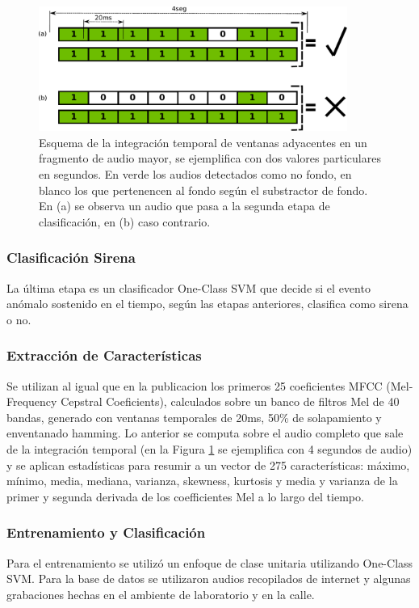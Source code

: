 \documentclass{article}
\begin{document}
\begin{figure}[h]
\begin{center}
\includegraphics[width=0.9\textwidth]{integracion_temporal} 
\caption{Esquema de la integración temporal de ventanas adyacentes en un fragmento de audio mayor, se ejemplifica con dos valores particulares en segundos. En verde los audios detectados como no fondo, en blanco los que pertenencen al fondo según el substractor de fondo. En (a) se observa un audio que pasa a la segunda etapa de clasificación, en (b) caso contrario.}
\label{fig:integracion_temporal}
\end{center}
\end{figure}
 
\subsubsection{Clasificación Sirena}
La última etapa es un clasificador One-Class SVM que decide si el evento anómalo sostenido en el tiempo, según las etapas anteriores, clasifica como sirena o no. 

\subsubsection*{Extracción de Características}
Se utilizan al igual que en la publicacion \cite{Salamon:UrbanSound:ACMMM:14} los primeros 25 coeficientes MFCC (Mel-Frequency Cepstral Coeficients), calculados sobre un banco de filtros Mel de 40 bandas, generado con ventanas temporales de 20ms, 50\% de solapamiento y enventanado hamming. Lo anterior se computa sobre el audio completo que sale de la integración temporal (en la Figura \ref{fig:integracion_temporal} se ejemplifica con 4 segundos de audio) y se aplican estadísticas para resumir a un vector de 275 características: máximo, mínimo, media, mediana, varianza, skewness, kurtosis y media y varianza de la primer y segunda derivada de los coefficientes Mel a lo largo del tiempo.

\subsubsection*{Entrenamiento y Clasificación}
Para el entrenamiento se utilizó un enfoque de clase unitaria utilizando One-Class SVM. Para la base de datos se utilizaron audios recopilados de internet y algunas grabaciones hechas en el ambiente de laboratorio y en la calle. 
\end{document}
